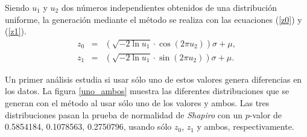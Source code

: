\documentclass[12pt]{article}
\begin{document}
	Siendo $u_1$ y $u_2$ dos números independientes obtenidos de una distribución uniforme, la generación mediante el método se realiza con las ecuaciones (\ref{z0}) y (\ref{z1}).
	\begin{eqnarray}
	z_0 &=& \left( \sqrt{-2 \ln u_1} \cdot \cos(2\pi u_2)\right) \sigma + \mu , \label{z0} \\
	z_1 &=& \left(  \sqrt{-2 \ln u_1} \cdot \sin(2\pi u_2) \right) \sigma + \mu . \label{z1}
	\end{eqnarray} 

	Un primer análisis estudia si usar sólo uno de estos valores genera diferencias en los datos. La figura \ref{uno_ambos} muestra las diferentes distribuciones que se generan con el método al usar sólo uno de los valores y ambos. Las tres distribuciones pasan la prueba de normalidad de {\em Shapiro} con un $p$-valor de 0.5854184, 0.1078563, 0.2750796, usando sólo $z_0$, $z_1$ y ambos, respectivamente.
	
\end{document}
